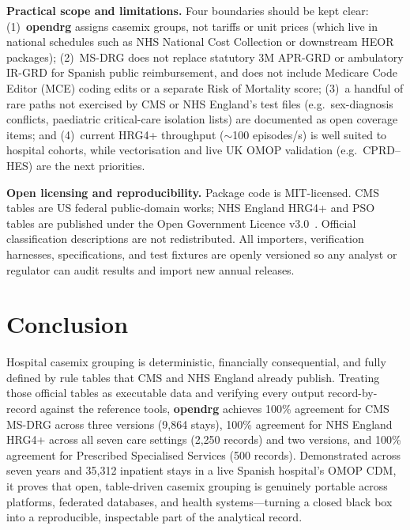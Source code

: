 \documentclass[fleqn,10pt]{IOMEDArticle}
\begin{document}
\textbf{Practical scope and limitations.} Four boundaries should be kept clear: (1)~\textbf{opendrg} assigns casemix groups, not tariffs or unit prices (which live in national schedules such as NHS National Cost Collection or downstream HEOR packages); (2)~MS-DRG does not replace statutory 3M APR-GRD or ambulatory IR-GRD for Spanish public reimbursement, and does not include Medicare Code Editor (MCE) coding edits or a separate Risk of Mortality score; (3)~a handful of rare paths not exercised by CMS or NHS England's test files (e.g.\ sex-diagnosis conflicts, paediatric critical-care isolation lists) are documented as open coverage items; and (4)~current HRG4+ throughput ($\sim$100 episodes/s) is well suited to hospital cohorts, while vectorisation and live UK OMOP validation (e.g.\ CPRD--HES) are the next priorities.

\textbf{Open licensing and reproducibility.} Package code is MIT-licensed. CMS tables are US federal public-domain works; NHS England HRG4+ and PSO tables are published under the Open Government Licence v3.0~\cite{ogl3}. Official classification descriptions are not redistributed. All importers, verification harnesses, specifications, and test fixtures are openly versioned so any analyst or regulator can audit results and import new annual releases.


\section{Conclusion}

Hospital casemix grouping is deterministic, financially consequential, and fully defined by rule tables that CMS and NHS England already publish. Treating those official tables as executable data and verifying every output record-by-record against the reference tools, \textbf{opendrg} achieves 100\% agreement for CMS MS-DRG across three versions (9{,}864 stays), 100\% agreement for NHS England HRG4+ across all seven care settings (2{,}250 records) and two versions, and 100\% agreement for Prescribed Specialised Services (500 records). Demonstrated across seven years and 35{,}312 inpatient stays in a live Spanish hospital's OMOP CDM, it proves that open, table-driven casemix grouping is genuinely portable across platforms, federated databases, and health systems---turning a closed black box into a reproducible, inspectable part of the analytical record.




\end{document}

